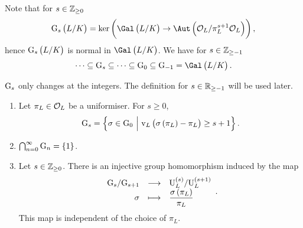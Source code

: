 Note that for $ s \in \mathbb{Z}_{\ge 0} $
$$ \G_s\br{L / K} = \ker \br{\Gal\br{L / K} \to \Aut \br{\OOO_L / \pi_L^{s + 1}\OOO_L}}, $$
hence $ \G_s\br{L / K} $ is normal in $ \Gal\br{L / K} $. We have for $ s \in \mathbb{Z}_{\ge -1} $
$$ \dots \subseteq \G_s \subseteq \dots \subseteq \G_0 \subseteq \G_{-1} = \Gal\br{L / K}. $$

\begin{remark*}
$ \mathrm{G}_s $ only changes at the integers. The definition for $ s \in \mathbb{R}_{\ge -1} $ will be used later.
\end{remark*}

\begin{theorem}
\label{thm:15.6}
\hfill
\begin{enumerate}
\item Let $ \pi_L \in \mathcal{O}_L $ be a uniformiser. For $ s \ge 0 $,
$$ \G_s = \cbr{\sigma \in \G_0 \st \v_L\br{\sigma\br{\pi_L} - \pi_L} \ge s + 1}. $$
\item $ \bigcap_{n = 0}^\infty \G_n = \cbr{1} $.
\item Let $ s \in \mathbb{Z}_{\ge 0} $. There is an injective group homomorphism induced by the map
$$ \function{\G_s / \G_{s + 1}}{\U_L^{\br{s}} / \U_L^{\br{s + 1}}}{\sigma}{\dfrac{\sigma\br{\pi_L}}{\pi_L}}. $$
This map is independent of the choice of $ \pi_L $.
\end{enumerate}
\end{theorem}

